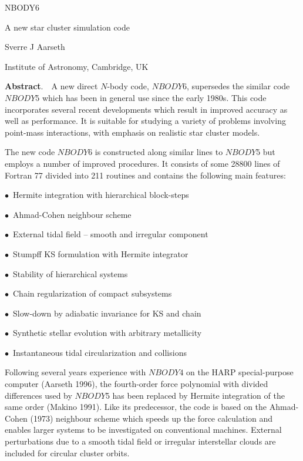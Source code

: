 \documentclass[12pt]{article}
\def\ZZ#1{$\scriptstyle #1$}
\begin{document}
\centerline {\LARGE \color{red} NBODY6}
\bigskip
\medskip
\centerline {\LARGE \color{blue} A new star cluster simulation code}
\bigskip
\bigskip
\centerline {\Large \color{green} Sverre J Aarseth}
\bigskip
\centerline {\Large \color{black}Institute of Astronomy, Cambridge, UK}
\bigskip
\bigskip
{\large
\noindent
{\bf Abstract}.~~A new direct $N$-body code, \ZZ {NBODY6},
supersedes the similar code \ZZ {NBODY5} which
has been in general use since the early 1980s.
This code incorporates several recent developments which result in
improved accuracy as well as performance.
It is suitable for studying a variety of problems involving point-mass
interactions, with emphasis on realistic star cluster models.

}
\bigskip
{\Large
The new code \ZZ {NBODY6} is constructed along similar lines to
\ZZ {NBODY5} but employs a number of improved procedures.
It consists of some 28800 lines of Fortran 77 divided into 211 routines
and contains the following main features:

\color{red}
\medskip
{$\bullet$}~Hermite integration with hierarchical block-steps

\medskip
{$\bullet$}~Ahmad-Cohen neighbour scheme

\medskip
{$\bullet$}~External tidal field -- smooth and irregular component

\color{blue}
\medskip
{$\bullet$}~Stumpff KS formulation with Hermite integrator

\color{green}
\medskip
{$\bullet$}~Stability of hierarchical systems

\color{cyan}
\medskip
{$\bullet$}~Chain regularization of compact subsystems

\color{magenta}
\medskip
{$\bullet$}~Slow-down by adiabatic invariance for KS and chain

\color{yuck}
\medskip
{$\bullet$}~Synthetic stellar evolution with arbitrary metallicity

\color{yuck2}
\medskip
{$\bullet$}~Instantaneous tidal circularization and collisions

\bigskip

\color{red}
Following several years experience with \ZZ {NBODY4} on the HARP
special-purpose computer (Aarseth 1996), the fourth-order force
polynomial with divided differences used by \ZZ {NBODY5} has been 
replaced by Hermite integration of the same order (Makino 1991).
Like its predecessor, the code is based on the Ahmad-Cohen (1973)
neighbour scheme which speeds up the force calculation and
enables larger systems to be investigated on conventional machines.
External perturbations due to a smooth tidal field or irregular
interstellar clouds are included for circular cluster orbits.

}
\end{document}

